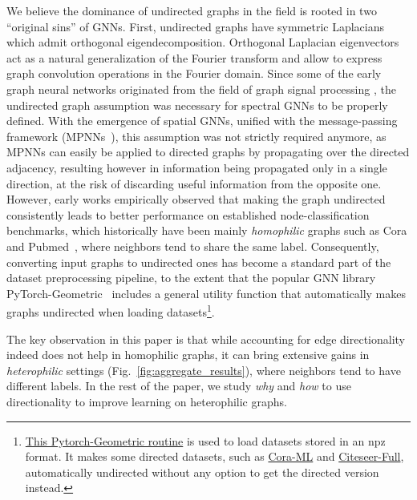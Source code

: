 \documentclass{article}
\theoremstyle{plain}
\theoremstyle{definition}
\theoremstyle{remark}
\begin{document}
We believe the dominance of undirected graphs in the field is rooted in two ``original sins'' of GNNs.   
First, undirected graphs have symmetric Laplacians which admit orthogonal eigendecomposition. Orthogonal Laplacian eigenvectors act as a natural generalization of the Fourier transform and allow to express graph convolution operations in the Fourier domain. 
Since some of the early graph neural networks originated from the field of graph signal processing \cite{shuman2013emerging,sandryhaila2013discrete}, the undirected graph assumption was necessary for spectral GNNs \cite{bruna2013spectral,defferrard2016convolutional,kipf2016semi} to be properly defined. 
With the emergence of spatial GNNs, unified with the message-passing framework (MPNNs~\cite{gilmer2017neural}), 
this assumption was not strictly required anymore, as MPNNs can easily be applied to directed graphs by propagating over the directed adjacency, resulting however in information being propagated only in a single direction, at the risk of discarding useful information from the opposite one. However, early works empirically observed that making the graph undirected consistently leads to better performance on established node-classification benchmarks, which historically have been mainly \textit{homophilic} graphs such as Cora and Pubmed~\cite{sen:aimag08}, where neighbors tend to share the same label. Consequently, converting input graphs to undirected ones has become a standard part of the dataset preprocessing pipeline, to the extent that the popular GNN library PyTorch-Geometric~\cite{fey2019graph} includes a general utility function that automatically makes graphs undirected when loading datasets\footnote{ \href{https://github.com/pyg-team/pytorch_geometric/blob/66b17806b1f4a2008e8be766064d9ef9a883ff03/torch_geometric/io/npz.py\#L26}{This Pytorch-Geometric routine} is used to load datasets stored in an npz format. It makes some directed datasets, such as \href{https://github.com/pyg-team/pytorch_geometric/blob/6fa2ee7bfef32311df73ca78266c18c4449a7382/torch_geometric/datasets/citation_full.py\#L99}{Cora-ML} and \href{https://github.com/pyg-team/pytorch_geometric/blob/6fa2ee7bfef32311df73ca78266c18c4449a7382/torch_geometric/datasets/citation_full.py\#L99}{Citeseer-Full}, automatically undirected without any option to get the directed version instead.}.

The key observation in this paper is that while accounting for edge directionality indeed does not help in homophilic graphs, it can bring extensive gains in \textit{heterophilic} settings (Fig.~\ref{fig:aggregate_results}), where neighbors tend to have different labels.
In the rest of the paper, we study \emph{why} and \emph{how} to use directionality to improve learning on heterophilic graphs. 
\end{document}
